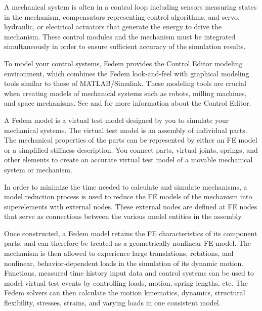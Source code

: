 
A mechanical system is often in a control loop including sensors
measuring states in the mechanism, compensators representing control
algorithms, and servo, hydraulic, or electrical actuators that
generate the energy to drive the mechanism. These control modules
and the mechanism must be integrated simultaneously in order to
ensure sufficient accuracy of the simulation results.

To model your control systems, Fedem provides the Control Editor
modeling environment, which combines the Fedem look-and-feel with graphical
modeling tools similar to those of MATLAB\Registered/Simulink\Registered.
These modeling tools are crucial when creating models of
mechanical systems such as robots, milling machines,
and space mechanisms.
See 
and 
for more information about the Control Editor.

\clearpage



A Fedem model is a virtual test model designed by you to
simulate your mechanical systems. The virtual test model
is an assembly of individual parts. The mechanical properties
of the parts can be represented by either an FE model or a
simplified stiffness description. You connect parts, virtual
joints, springs, and other elements to create an accurate
virtual test model of a movable mechanical system or mechanism.

In order to minimize the time needed to calculate and simulate
mechanisms, a model reduction process is used to reduce the FE
models of the mechanism into superelements with external nodes.
These external nodes are defined at FE nodes that serve as
connections between the various model entities in the assembly.

Once constructed, a Fedem model retains the FE characteristics
of its component parts, and can therefore be treated as a
geometrically nonlinear FE model. The mechanism is then allowed
to experience large translations, rotations, and nonlinear,
behavior-dependent loads in the simulation of its dynamic motion.
Functions, measured time history input data and control
systems can be used to model virtual test events by controlling
loads, motion, spring lengths, etc.
The Fedem solvers can then calculate the motion kinematics,
dynamics, structural flexibility, stresses, strains, and
varying loads in one consistent model.


